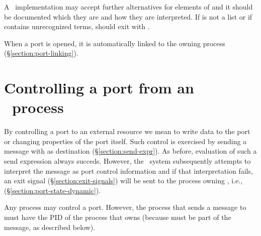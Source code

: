 \ifStd
A \StdErlang\ implementation may accept further alternatives for
elements of  and it should be documented which they are
and how they are interpreted.
\fi
If  is not a list or if  contains unrecognized terms,
 should exit with .

When a port is opened, it is automatically linked to the owning process
(\S\ref{section:port-linking}).

\section{Controlling a port from an \Erlang\ process}

\label{section:port-control}

By controlling a port  to an external resource we mean to
write data to the port or changing properties of the port itself.
Such control is exercised by
sending a message with  as destination
(\S\ref{section:send-expr}).  As before, evaluation
of such a send expression always succeds.  However, the \Erlang\ system
subsequently attempts to interpret the message as port control information and if
that interpretation fails, an exit signal (\S\ref{section:exit-signals})
will be sent to the process owning , i.e.,
(\S\ref{section:port-state-dynamic}).

Any process may control a port.  However, the process that sends
a message to 
must have the PID of the process that owns  (because  must
be part of the message, as described below).

